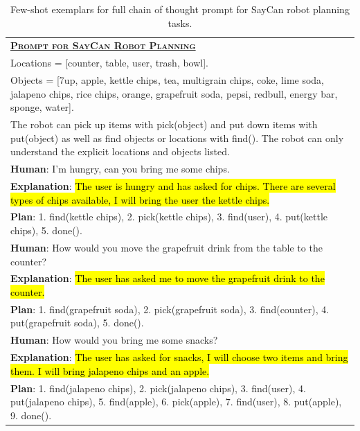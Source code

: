 \begingroup
\begin{table}[H]
    \centering
    \small
    \caption{
    Few-shot exemplars for full chain of thought prompt for SayCan robot planning tasks.
    }
    \begin{tabular}{p{\linewidth}}
        \toprule
        \underline{\textbf{\textsc{Prompt for SayCan Robot Planning}}} \\
        \vspace{-2mm}
        Locations = [counter, table, user, trash, bowl]. \\
Objects = [7up, apple, kettle chips, tea, multigrain chips, coke, lime soda, jalapeno chips, rice chips, orange, grapefruit soda, pepsi, redbull, energy bar, sponge, water]. \\
The robot can pick up items with pick(object) and put down items with put(object) as well as find objects or locations with find(). The robot can only understand the explicit locations and objects listed. \\
\vspace{0mm} \textbf{Human}: I'm hungry, can you bring me some chips. \\ \vspace{-1mm}
\textbf{Explanation}: \hl{The user is hungry and has asked for chips. There are several types of chips available, I will bring the user the kettle chips.}  \\
\textbf{Plan}: 1. find(kettle chips), 2. pick(kettle chips), 3. find(user), 4. put(kettle chips), 5. done(). \\
\vspace{0mm} \textbf{Human}: How would you move the grapefruit drink from the table to the counter? \\ \vspace{-1mm}
\textbf{Explanation}: \hl{The user has asked me to move the grapefruit drink to the counter.} \\
\textbf{Plan}: 1. find(grapefruit soda), 2. pick(grapefruit soda), 3. find(counter), 4. put(grapefruit soda), 5. done(). \\
\vspace{0mm} \textbf{Human}: How would you bring me some snacks? \\ \vspace{-1mm}
\textbf{Explanation}: \hl{The user has asked for snacks, I will choose two items and bring them. I will bring jalapeno chips and an apple.} \\ 
\textbf{Plan}: 1. find(jalapeno chips), 2. pick(jalapeno chips), 3. find(user), 4. put(jalapeno chips), 5. find(apple), 6. pick(apple), 7. find(user), 8. put(apple), 9. done().  \\

\end{tabular}
\end{table}
